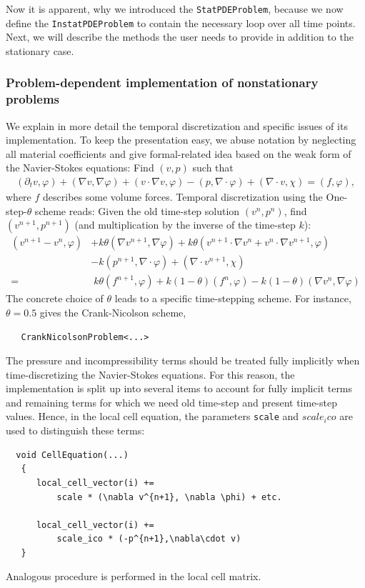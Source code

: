 \documentclass[prodmode,acmtoms]{acmsmall}
\numberwithin{equation}{section}
\renewcommand{\phi}{\varphi}
\begin{document}
Now it is apparent, why we introduced the \texttt{StatPDEProblem}, because
we now define the \texttt{InstatPDEProblem} to contain the necessary 
loop over all time points. Next, we will describe the methods the user needs to 
provide in addition to the stationary case.

\subsubsection{Problem-dependent 
implementation of nonstationary problems}
\label{sec:timedep:implementation}
We explain in more detail the temporal discretization
and specific issues of its implementation. 
To keep the presentation easy, we abuse notation 
by neglecting
all material coefficients
and give formal-related idea based on the weak 
form of the Navier-Stokes equations:
Find $(v,p)$ such that
\begin{align*}
(\partial_t v,\phi) 
+ (\nabla v, \nabla \phi)
+ (v\cdot\nabla v,\phi)
-(p,\nabla\cdot \phi)
+(\nabla\cdot v, \chi)
=(f,\phi),
\end{align*}
where $f$ describes some volume forces.
Temporal discretization using the One-step-$\theta$ scheme reads:
Given the old time-step solution $(v^n,p^n)$, 
find $(v^{n+1}, p^{n+1})$ (and multiplication 
by the inverse of the time-step $k$):
\begin{align*}
(v^{n+1} - v^{n}, \phi)
&+ k\theta (\nabla v^{n+1}, \nabla \phi)
+ k\theta (v^{n+1}\cdot\nabla v^n + 
  v^{n}\cdot\nabla v^{n+1},\phi)\\
&- k (p^{n+1},\nabla\cdot \phi)
+ (\nabla\cdot v^{n+1}, \chi)\\
=&\; k\theta (f^{n+1},\phi) + k(1-\theta) (f^{n},\phi)
- k(1-\theta) (\nabla v^{n}, \nabla \phi) 
\end{align*}
The concrete choice of $\theta$ leads to a
specific time-stepping scheme. For instance,
$\theta = 0.5$ gives the Crank-Nicolson scheme,
\begin{lstlisting}
   CrankNicolsonProblem<...>
\end{lstlisting}


The pressure and incompressibility terms should be 
treated fully implicitly when time-discretizing 
the Navier-Stokes equations.
For this reason, the implementation is split up
into several items to account for fully implicit 
terms and remaining terms for which we need 
old time-step and present time-step values. 
Hence, in the local cell equation, the parameters
\texttt{scale} and \texttt{$scale_ico$}
are used to distinguish these terms:
\begin{lstlisting}
  void CellEquation(...)
   {
      local_cell_vector(i) +=  
          scale * (\nabla v^{n+1}, \nabla \phi) + etc.

      local_cell_vector(i) +=  
          scale_ico * (-p^{n+1},\nabla\cdot v)
   }
\end{lstlisting}
Analogous procedure is performed in the local 
cell matrix.
\end{document}
